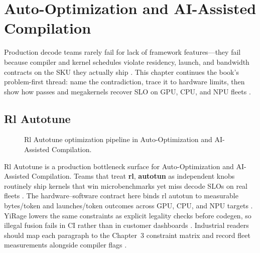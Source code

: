 \chapter{Auto-Optimization and AI-Assisted Compilation}
\label{chap:ch25}

Production decode teams rarely fail for lack of framework features---they fail because compiler and kernel schedules violate residency, launch, and bandwidth contracts on the SKU they actually ship \citep{patel2025llminference,nvidia2022hopper}. This chapter continues the book's problem-first thread: name the contradiction, trace it to hardware limits, then show how passes and megakernels recover SLO on GPU, CPU, and NPU fleets \citep{taxbreak2026,semianalysis2024tma}.

\section{Rl Autotune}
\label{sec:rl_autotune}
\begin{figure}[t]
\centering
{}
\caption{Rl Autotune optimization pipeline in Auto-Optimization and AI-Assisted Compilation.}
\label{fig:rl_autotune_pipeline}
\end{figure}


Rl Autotune is a production bottleneck surface for Auto-Optimization and AI-Assisted Compilation. Teams that treat \textbf{rl}, \textbf{autotun} as independent knobs routinely ship kernels that win microbenchmarks yet miss decode SLOs on real fleets \citep{patel2025llminference,nvidia2022hopper}. The hardware--software contract here binds rl autotun to measurable bytes/token and launches/token outcomes across GPU, CPU, and NPU targets \citep{taxbreak2026,semianalysis2024tma}. YiRage lowers the same constraints as explicit legality checks before codegen, so illegal fusion fails in CI rather than in customer dashboards \citep{memoryfloor2026,amd2024xdna}. Industrial readers should map each paragraph to the Chapter~3 constraint matrix and record fleet measurements alongside compiler flags \citep{nvidia2022hopper,amd2024aie}.

